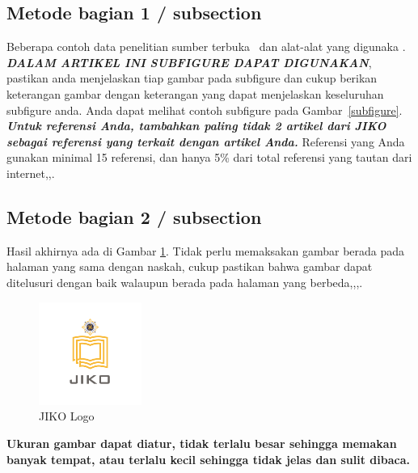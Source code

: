 \documentclass[
 manuscript=article,  %
  layout=publish, 
  year=2024, 
  month= Februari, %
  volume=8,
  number=1 
]{JIKO}
\begin{document}
\subsection{Metode bagian 1 / subsection}

Beberapa contoh data penelitian sumber terbuka~\cite{Barden2000} dan alat-alat yang digunaka \cite{Growth2009,Lutfiyana2017,Pramana2013}.
\textbf{\textit{DALAM ARTIKEL INI SUBFIGURE DAPAT DIGUNAKAN}}, pastikan anda menjelaskan tiap gambar pada subfigure dan cukup berikan keterangan gambar dengan keterangan yang dapat menjelaskan keseluruhan subfigure anda.  Anda dapat melihat contoh subfigure pada Gambar~\ref{subfigure}. \\
\textbf{\textit{Untuk referensi Anda, tambahkan paling tidak 2 artikel dari JIKO sebagai referensi yang terkait dengan artikel Anda.}} Referensi yang Anda gunakan minimal 15 referensi, dan hanya 5\% dari total referensi yang tautan dari internet\cite{Johnson1962},\cite{articleLekshmi},\cite{Hunduma2020}.

\subsection{Metode bagian 2 / subsection}


 Hasil akhirnya ada di Gambar \ref{fig:logo}. Tidak perlu memaksakan gambar berada pada halaman yang sama dengan naskah, cukup pastikan bahwa gambar dapat ditelusuri dengan baik walaupun berada pada halaman yang berbeda\cite{Erwi2015},\cite{Transport},\cite{soil-1-273-2015},\cite{article}.

\begin{figure}[ht!]
  \centering
  \includegraphics[width=0.3\textwidth]{JIKOlogo.png}
  \caption{JIKO Logo}
  \label{fig:logo}
\end{figure}

\textbf{Ukuran gambar dapat diatur, tidak terlalu besar sehingga memakan banyak tempat, atau terlalu kecil sehingga tidak jelas dan sulit dibaca.}
\end{document}
